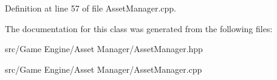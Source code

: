 Definition at line 57 of file Asset\+Manager.\+cpp.


\begin{DoxyCode}{0}

\end{DoxyCode}


The documentation for this class was generated from the following files\+:\begin{DoxyCompactItemize}
\item 
src/\+Game Engine/\+Asset Manager/Asset\+Manager.\+hpp\item 
src/\+Game Engine/\+Asset Manager/Asset\+Manager.\+cpp\end{DoxyCompactItemize}
